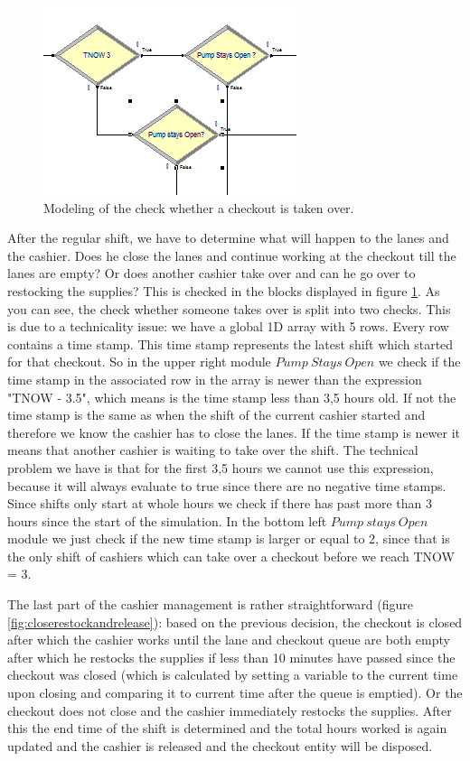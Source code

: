 \begin{figure}[]
\begin{center}
	\includegraphics[scale=1]{images/model-description/determine-takeover.PNG}
	\caption{Modeling of the check whether a checkout is taken over.}
	\label{fig:determinetakeover}
\end{center}
\end{figure}

After the regular shift, we have to determine what will happen to the lanes and the cashier. 
Does he close the lanes and continue working at the checkout till the lanes are empty? 
Or does another cashier take over and can he go over to restocking the supplies? 
This is checked in the blocks displayed in figure \ref{fig:determinetakeover}. 
As you can see, the check whether someone takes over is split into two checks. 
This is due to a technicality issue: we have a global 1D array with 5 rows. 
Every row contains a time stamp. 
This time stamp represents the latest shift which started for that checkout. 
So in the upper right module $Pump \ Stays \ Open$ we check if the time stamp in the associated row in the array is newer than the expression "TNOW - 3.5", which means is the time stamp less than 3,5 hours old. 
If not the time stamp is the same as when the shift of the current cashier started and therefore we know the cashier has to close the lanes. 
If the time stamp is newer it means that another cashier is waiting to take over the shift. 
The technical problem we have is that for the first 3,5 hours we cannot use this expression, because it will always evaluate to true since there are no negative time stamps. 
Since shifts only start at whole hours we check if there has past more than 3 hours since the start of the simulation. 
In the bottom left $Pump \ stays \ Open$ module we just check if the new time stamp is larger or equal to 2, since that is the only shift of cashiers which can take over a checkout before we reach TNOW = 3. 

The last part of the cashier management is rather straightforward (figure \ref{fig:closerestockandrelease}): based on the previous decision, the checkout is closed after which the cashier works until the lane and checkout queue are both empty after which he restocks the supplies if less than 10 minutes have passed since the checkout was closed (which is calculated by setting a variable to the current time upon closing and comparing it to current time after the queue is emptied). 
Or the checkout does not close and the cashier immediately restocks the supplies.
After this the end time of the shift is determined and the total hours worked is again updated and the cashier is released and the checkout entity will be disposed.

